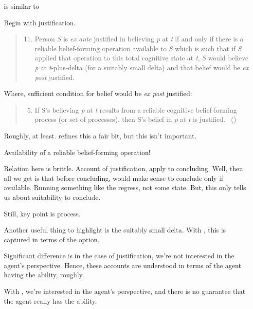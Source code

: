 \begin{note}
  \citeauthor{Turri:2010aa} is similar to \citeauthor{Goldman:1979ui}

  Begin with justification.

  \begin{quote}
    \begin{enumerate}[label=(\arabic*)]
      \setcounter{enumi}{10}
    \item
      Person \emph{S} is \emph{ex ante} justified in believing \emph{p} at \emph{t} if and only if there is a reliable belief-forming operation available to \emph{S} which is such that if \emph{S} applied that operation to this total cognitive state at \emph{t}, \emph{S} would believe \emph{p} at \emph{t}-plus-delta (for a suitably small delta) and that belief would be \emph{ex post} justified.
    \end{enumerate}
  \end{quote}

  Where, sufficient condition for belief would be \emph{ex post} justified:
  \begin{quote}
    \begin{enumerate}[label=(\arabic*)]
      \setcounter{enumi}{4}
    \item
      If S's believing \emph{p} at \emph{t} results from a reliable cognitive belief-forming process (or set of processes), then S's belief in \emph{p} at \emph{t} is justified.%
      \mbox{ }\hfill\mbox{(\citeyear[13]{Goldman:1979ui})}
    \end{enumerate}
  \end{quote}
  Roughly, at least.
  \citeauthor{Goldman:1979ui} refines this a fair bit, but this isn't important.

  Availability of a reliable belief-forming operation!

  Relation here is brittle.
  Account of justification, apply to concluding.
  Well, then all we get is that before concluding, would make sense to conclude only if available.
  Running something like the \citeauthor{Carroll:1895uj} regress, not some state.
  But, this only tells us about suitability to conclude.

  Still, key point is process.

  Another useful thing to highlight is the suitably small delta.
  With \requ{}, this is captured in terms of the option.
\end{note}

\begin{note}
  Significant difference is in the case of justification, we're not interested in the agent's perspective.
  Hence, these accounts are understood in terms of the agent having the ability, roughly.

  With \qzS{}, we're interested in the agent's perspective, and there is no guarantee that the agent really has the ability.
\end{note}

